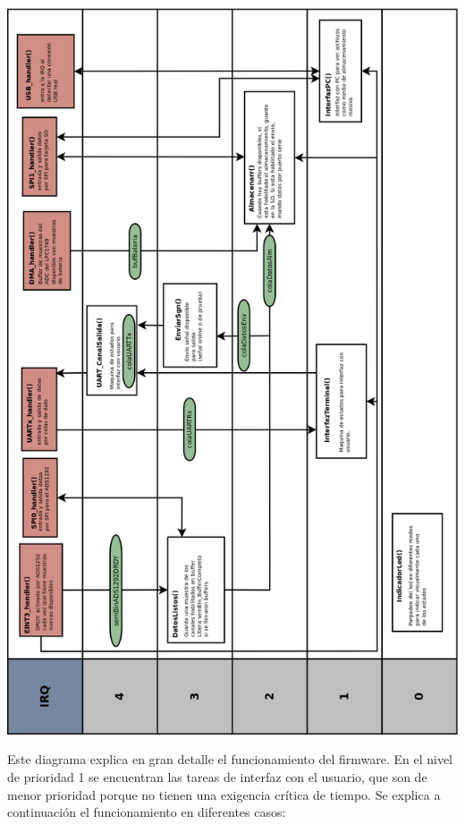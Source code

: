 \begin{adjustbox}{center,caption={Diagrama de tareas completo},label={fig:tareasCompleto},nofloat=figure,vspace=\bigskipamount}
\includegraphics[scale = 0.24]{./Figures/tareasCompleto.png}
\end{adjustbox}
	
Este diagrama explica en gran detalle el funcionamiento del firmware. En el nivel de prioridad 1 se encuentran las tareas de interfaz con el usuario, que son de menor prioridad porque no tienen una exigencia crítica de tiempo. Se explica a continuación el funcionamiento en diferentes casos:

